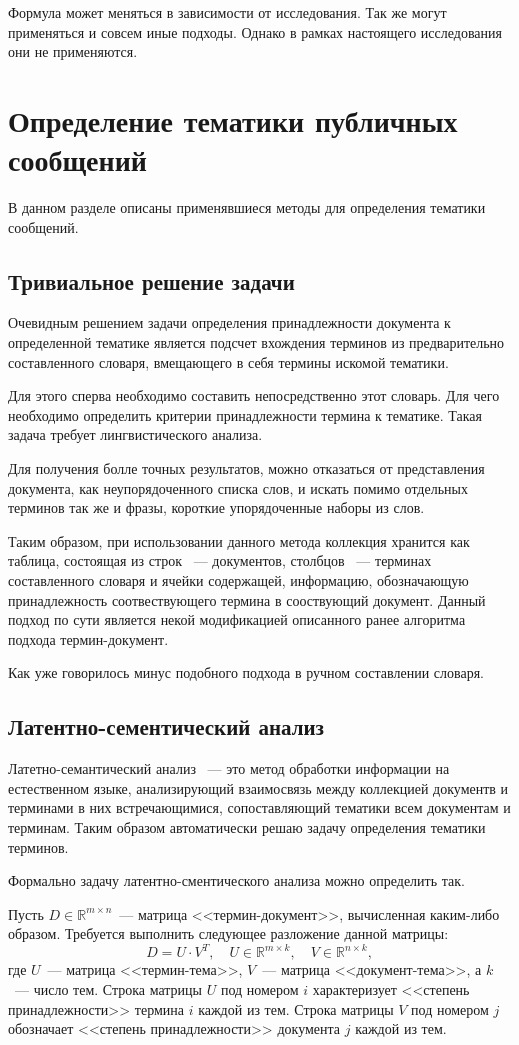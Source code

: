 \documentclass[annotation,times,page4]{itmo-student-thesis}
\begin{document}
Формула может меняться в зависимости от исследования. Так же могут применяться и совсем иные подходы. Однако в рамках настоящего исследования они не применяются.

\section{Определение тематики публичных сообщений}
В данном разделе описаны применявшиеся методы для определения тематики сообщений.
\subsection{Тривиальное решение задачи}
Очевидным решением задачи определения принадлежности документа к определенной тематике является подсчет вхождения терминов из предварительно составленного словаря, вмещающего в себя термины искомой тематики.

Для этого сперва необходимо составить непосредственно этот словарь. Для чего необходимо определить критерии принадлежности термина к тематике. Такая задача требует лингвистического анализа.

Для получения болле точных результатов, можно отказаться от представления документа, как неупорядоченного списка слов, и искать помимо отдельных терминов так же и фразы, короткие упорядоченные наборы из слов.

Таким образом, при использовании данного метода коллекция хранится как таблица, состоящая из строк ~--- документов, столбцов ~--- терминах составленного словаря и ячейки содержащей, информацию, обозначающую принадлежность соотвествующего термина в сооствующий документ. Данный подход по сути является некой модификацией описанного ранее алгоритма подхода термин-документ.

Как уже говорилось минус подобного подхода в ручном составлении словаря.
\subsection{Латентно-сементический анализ}
Латетно-семантический анализ ~--- это метод обработки информации на естественном языке, анализирующий взаимосвязь между коллекцией документв и терминами в них встречающимися, сопоставляющий тематики всем документам и терминам. Таким образом автоматически решаю задачу определения тематики терминов.

Формально задачу латентно-сментического анализа можно определить так.

Пусть $D \in \mathbb{R}^{m \times n}$~--- матрица 
<<термин-документ>>, вычисленная каким-либо образом. Требуется
выполнить следующее разложение данной матрицы:
\[
    D = U \cdot V^T,\quad U \in \mathbb{R}^{m \times k},\quad V \in \mathbb{R}^{n \times k},
\]
где $U$~--- матрица <<термин-тема>>, $V$~--- матрица <<документ-тема>>,
а $k$~--- число тем. Строка матрицы $U$ под номером $i$ 
характеризует <<степень принадлежности>> термина $i$ 
каждой из тем. Строка матрицы $V$ под номером $j$ обозначает
<<степень принадлежности>> документа $j$ каждой из тем.
\end{document}
